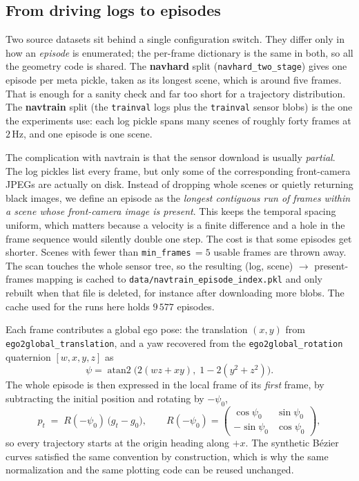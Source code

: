 \subsection{From driving logs to episodes}
\label{sec:navsim-episodes}

Two source datasets sit behind a single configuration switch. They differ only in
how an \emph{episode} is enumerated; the per-frame dictionary is the same in
both, so all the geometry code is shared. The \textbf{navhard} split
(\texttt{navhard\_two\_stage}) gives one episode per meta pickle, taken as its
longest scene, which is around five frames. That is enough for a sanity check and
far too short for a trajectory distribution. The \textbf{navtrain} split (the
\texttt{trainval} logs plus the \texttt{trainval} sensor blobs) is the one the
experiments use: each log pickle spans many scenes of roughly forty frames at
$2$\,Hz, and one episode is one scene.

The complication with navtrain is that the sensor download is usually
\emph{partial}. The log pickles list every frame, but only some of the
corresponding front-camera JPEGs are actually on disk. Instead of dropping whole
scenes or quietly returning black images, we define an episode as the
\emph{longest contiguous run of frames within a scene whose front-camera image is
present}. This keeps the temporal spacing uniform, which matters because a
velocity is a finite difference and a hole in the frame sequence would silently
double one step. The cost is that some episodes get shorter. Scenes with fewer
than \texttt{min\_frames}$\,=5$ usable frames are thrown away. The scan touches
the whole sensor tree, so the resulting (log, scene) $\to$ present-frames mapping
is cached to \texttt{data/navtrain\_episode\_index.pkl} and only rebuilt when
that file is deleted, for instance after downloading more blobs. The cache used
for the runs here holds $9\,577$ episodes.

Each frame contributes a global ego pose: the translation $(x,y)$ from
\texttt{ego2global\_translation}, and a yaw recovered from the
\texttt{ego2global\_rotation} quaternion $[w,x,y,z]$ as
\begin{equation}
\psi = \operatorname{atan2}\!\big(2(wz+xy),\; 1-2(y^2+z^2)\big).
\label{eq:yaw}
\end{equation}
The whole episode is then expressed in the local frame of its \emph{first} frame,
by subtracting the initial position and rotating by $-\psi_0$,
\begin{equation}
p_t \;=\; R(-\psi_0)\,\big(g_t - g_0\big),
\qquad
R(-\psi_0)=\begin{pmatrix}\cos\psi_0 & \sin\psi_0\\ -\sin\psi_0 & \cos\psi_0\end{pmatrix},
\label{eq:local-frame}
\end{equation}
so every trajectory starts at the origin heading along $+x$. The synthetic
B\'ezier curves satisfied the same convention by construction, which is why the
same normalization and the same plotting code can be reused unchanged.

